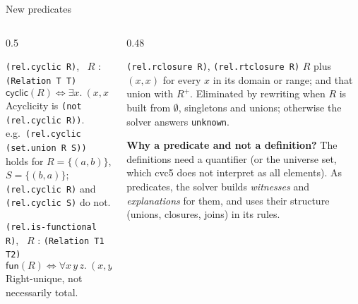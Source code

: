 \documentclass[aspectratio=169]{beamer}
\newcommand{\sm}[1]{\texttt{#1}}
\newcommand{\cyc}[1]{\mathsf{cyclic}(#1)}
\newcommand{\fun}[1]{\mathsf{fun}(#1)}
\begin{document}
\begin{frame}{New predicates}
  \begin{columns}[T]
  \begin{column}{0.5\textwidth}
    \begin{block}{\sm{(rel.cyclic R)}, \ $R$ : \sm{(Relation T T)}}
      \small
      \[ \cyc{R} \iff \exists x.\ (x,x)\in R^{+} \]
      Acyclicity is \sm{(not (rel.cyclic R))}.\\[1mm]
      e.g.\ \sm{(rel.cyclic (set.union R S))} holds for $R=\{(a,b)\}$, $S=\{(b,a)\}$;
      \sm{(rel.cyclic R)} and \sm{(rel.cyclic S)} do not.
    \end{block}
    \begin{block}{\sm{(rel.is-functional R)}, \ $R$ : \sm{(Relation T1 T2)}}
      \small
      \[ \fun{R} \iff \forall x\,y\,z.\ (x,y),(x,z)\in R \Rightarrow y=z \]
      Right-unique, not necessarily total.
    \end{block}
  \end{column}
  \begin{column}{0.48\textwidth}
    \begin{block}{\sm{(rel.rclosure R)}, \sm{(rel.rtclosure R)}}
      \small
      $R$ plus $(x,x)$ for every $x$ in its domain or range; and that union with
      $R^{+}$. Eliminated by rewriting when $R$ is built from $\emptyset$, singletons and
      unions; otherwise the solver answers \sm{unknown}.
    \end{block}
    \small
    \textbf{Why a predicate and not a definition?} The definitions need a quantifier (or the
    universe set, which cvc5 does not interpret as all elements). As predicates, the solver
    builds \emph{witnesses} and \emph{explanations} for them, and uses their structure
    (unions, closures, joins) in its rules.
  \end{column}
  \end{columns}
\end{frame}
\end{document}
